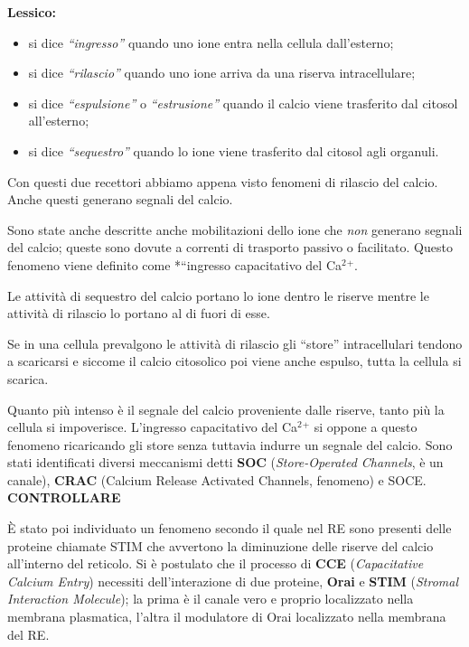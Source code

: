 \documentclass[]{article}
\begin{document}
\textbf{Lessico:}

\begin{itemize}
\itemsep1pt\parskip0pt
\item
  si dice \emph{``ingresso''} quando uno ione entra nella cellula
  dall'esterno;
\item
  si dice \emph{``rilascio''} quando uno ione arriva da una riserva
  intracellulare;
\item
  si dice \emph{``espulsione''} o \emph{``estrusione''} quando il calcio
  viene trasferito dal citosol all'esterno;
\item
  si dice \emph{``sequestro''} quando lo ione viene trasferito dal
  citosol agli organuli.
\end{itemize}

Con questi due recettori abbiamo appena visto fenomeni di rilascio del
calcio. Anche questi generano segnali del calcio.

Sono state anche descritte anche mobilitazioni dello ione che \emph{non}
generano segnali del calcio; queste sono dovute a correnti di trasporto
passivo o facilitato. Questo fenomeno viene definito come *``ingresso
capacitativo del Ca\(^2\)\(^+\).

Le attività di sequestro del calcio portano lo ione dentro le riserve
mentre le attività di rilascio lo portano al di fuori di esse.

Se in una cellula prevalgono le attività di rilascio gli ``store''
intracellulari tendono a scaricarsi e siccome il calcio citosolico poi
viene anche espulso, tutta la cellula si scarica.

Quanto più intenso è il segnale del calcio proveniente dalle riserve,
tanto più la cellula si impoverisce. L'ingresso capacitativo del
Ca\(^2\)\(^+\) si oppone a questo fenomeno ricaricando gli store senza
tuttavia indurre un segnale del calcio. Sono stati identificati diversi
meccanismi detti \textbf{SOC} (\emph{Store-Operated Channels}, è un
canale), \textbf{CRAC} (Calcium Release Activated Channels, fenomeno) e
SOCE. \textbf{CONTROLLARE}

È stato poi individuato un fenomeno secondo il quale nel RE sono
presenti delle proteine chiamate STIM che avvertono la diminuzione delle
riserve del calcio all'interno del reticolo. Si è postulato che il
processo di \textbf{CCE} (\emph{Capacitative Calcium Entry}) necessiti
dell'interazione di due proteine, \textbf{Orai} e \textbf{STIM}
(\emph{Stromal Interaction Molecule}); la prima è il canale vero e
proprio localizzato nella membrana plasmatica, l'altra il modulatore di
Orai localizzato nella membrana del RE.
\end{document}
